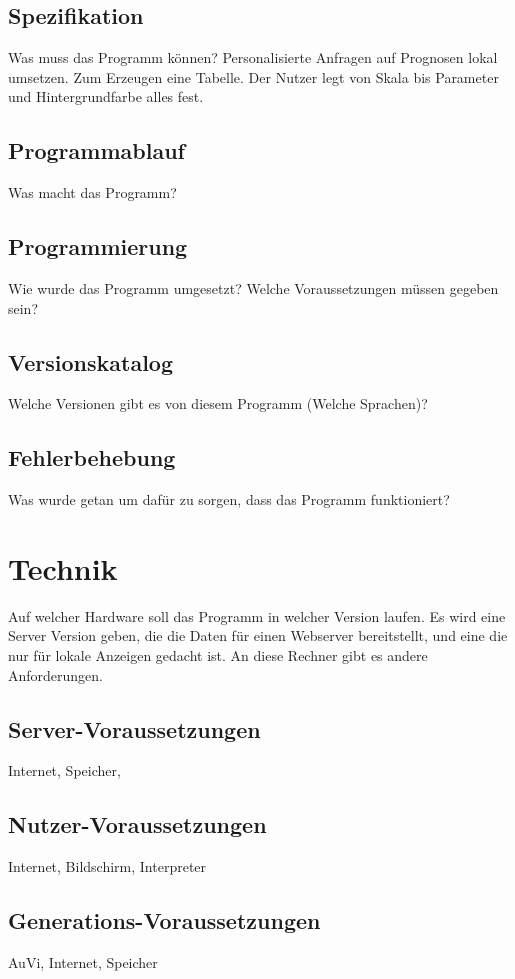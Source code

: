 \documentclass[a4paper,oneside,10pt,titlepage]{article}
\begin{document}
\subsection{Spezifikation}
Was muss das Programm können?
Personalisierte Anfragen auf Prognosen lokal umsetzen. Zum Erzeugen eine Tabelle. Der Nutzer legt von Skala bis Parameter und Hintergrundfarbe alles fest.
\subsection{Programmablauf}
Was macht das Programm?
\subsection{Programmierung}
Wie wurde das Programm umgesetzt? Welche Voraussetzungen müssen gegeben sein?
\subsection{Versionskatalog}
Welche Versionen gibt es von diesem Programm (Welche Sprachen)?
\subsection{Fehlerbehebung}
Was wurde getan um dafür zu sorgen, dass das Programm funktioniert?
\section{Technik}
Auf welcher Hardware soll das Programm in welcher Version laufen. Es wird eine Server Version geben, die die Daten für einen Webserver bereitstellt, und eine die nur für lokale Anzeigen gedacht ist. An diese Rechner gibt es andere Anforderungen.
\subsection{Server-Voraussetzungen}
Internet, Speicher,
\subsection{Nutzer-Voraussetzungen}
Internet, Bildschirm, Interpreter
\subsection{Generations-Voraussetzungen}
AuVi, Internet, Speicher
\end{document}
